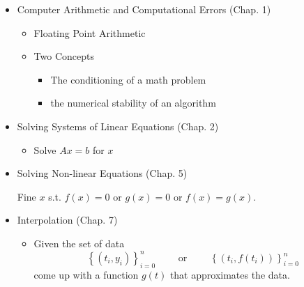 \begin{itemize}
    \item Computer Arithmetic and Computational Errors (Chap. 1)
          \begin{itemize}
              \item Floating Point Arithmetic
              \item Two Concepts
                    \begin{itemize}
                        \item The conditioning of a math problem
                        \item the numerical stability of an algorithm
                    \end{itemize}
          \end{itemize}

    \item Solving Systems of Linear Equations (Chap. 2)

          \begin{itemize}
              \item Solve \( A x = b \) for \( x \)
          \end{itemize}

    \item Solving Non-linear Equations (Chap. 5)

          Fine \( x \) s.t. \( f(x) = 0 \) or \( g(x) = 0 \) or \( f(x) = g(x) \).

    \item Interpolation (Chap. 7)
          \begin{itemize}
              \item  Given the set of data \[
                        \left\{ (t_i, y_i) \right\}_{i=0}^{n}
                        \qquad \text{ or } \qquad
                        \left\{ (t_i, f(t_i)) \right\}_{i=0}^{n}
                    \] come up with a function $g(t)$ that approximates the data.
          \end{itemize}
\end{itemize}